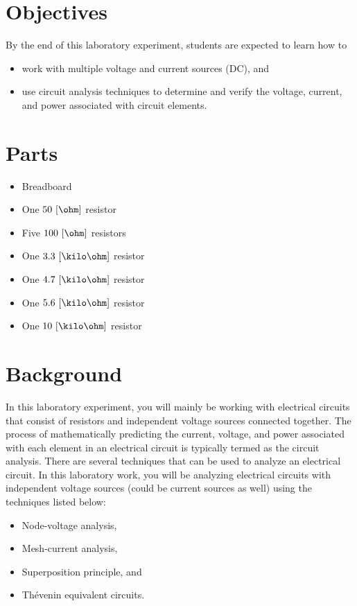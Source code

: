 \section{Objectives}
By the end of this laboratory experiment, students are expected to learn how to 

\begin{itemize}
\item work with multiple voltage and current sources (DC), and   
\item use circuit analysis techniques to determine and verify the voltage, current, and power associated with  circuit elements. 
\end{itemize}

\section{Parts}
\label{sec:partsEx4}

\begin{itemize}
\item Breadboard  
\item One $50~[\ohm]$ resistor
\item Five $100~[\ohm]$ resistors  
\item One $3.3~[\kilo\ohm]$ resistor
\item One $4.7~[\kilo\ohm]$ resistor
\item One $5.6~[\kilo\ohm]$ resistor  
\item One $10~[\kilo\ohm]$ resistor
\end{itemize}

\section{Background}
\label{sec:background}

In this laboratory experiment, you will mainly be working with electrical circuits that consist of resistors and independent voltage sources connected together. The process of mathematically predicting the current, voltage, and power associated with each element in an electrical circuit is typically termed as the circuit analysis. There are several techniques that can be used to analyze an electrical circuit. In this laboratory work, you will  be analyzing electrical circuits with independent voltage  sources (could be current sources as well) using the techniques listed below: %
%
    \begin{itemize}
      
    \item Node-voltage analysis, 
      
    \item Mesh-current analysis,

    \item Superposition principle, and 
    
    \item Th\'evenin equivalent circuits.

    \end{itemize}





